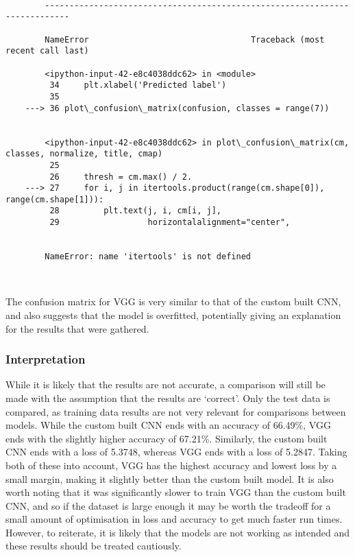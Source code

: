 \documentclass[11pt]{article}
\begin{document}
    \begin{Verbatim}[commandchars=\\\{\}]

        ---------------------------------------------------------------------------

        NameError                                 Traceback (most recent call last)

        <ipython-input-42-e8c4038ddc62> in <module>
         34     plt.xlabel('Predicted label')
         35 
    ---> 36 plot\_confusion\_matrix(confusion, classes = range(7))
    

        <ipython-input-42-e8c4038ddc62> in plot\_confusion\_matrix(cm, classes, normalize, title, cmap)
         25 
         26     thresh = cm.max() / 2.
    ---> 27     for i, j in itertools.product(range(cm.shape[0]), range(cm.shape[1])):
         28         plt.text(j, i, cm[i, j],
         29                  horizontalalignment="center",
    

        NameError: name 'itertools' is not defined

    \end{Verbatim}

    \begin{center}
    \end{center}
    { \hspace*{\fill} \\}
    
    The confusion matrix for VGG is very similar to that of the custom built
CNN, and also suggests that the model is overfitted, potentially giving
an explanation for the results that were gathered.

    \hypertarget{interpretation}{%
\subsubsection{Interpretation}\label{interpretation}}

While it is likely that the results are not accurate, a comparison will
still be made with the assumption that the results are `correct'. Only
the test data is compared, as training data results are not very
relevant for comparisons between models. While the custom built CNN ends
with an accuracy of 66.49\%, VGG ends with the slightly higher accuracy
of 67.21\%. Similarly, the custom built CNN ends with a loss of 5.3748,
whereas VGG ends with a loss of 5.2847. Taking both of these into
account, VGG has the highest accuracy and lowest loss by a small margin,
making it slightly better than the custom built model. It is also worth
noting that it was significantly slower to train VGG than the custom
built CNN, and so if the dataset is large enough it may be worth the
tradeoff for a small amount of optimisation in loss and accuracy to get
much faster run times. However, to reiterate, it is likely that the
models are not working as intended and these results should be treated
cautiously.
\end{document}
